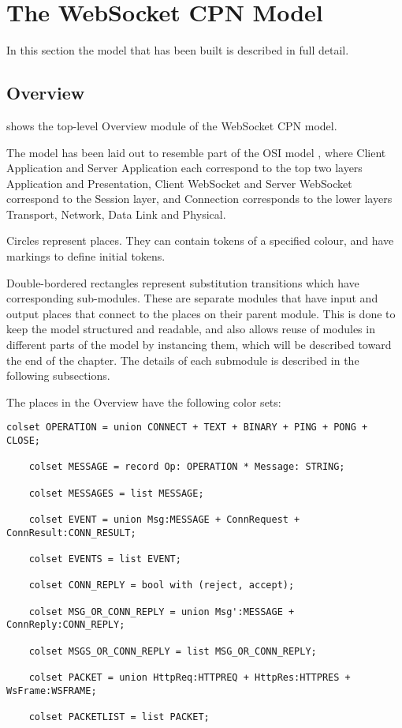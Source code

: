 \section{The WebSocket CPN Model}

In this section the model that has been built is described in full detail.

\subsection{Overview}

	
	 shows the top-level Overview module of the WebSocket
	CPN model.
	
	The model has been laid out to resemble part of the OSI model \cite{osi7}, where
	Client Application and Server Application each correspond to the top two
	layers Application and Presentation, Client WebSocket and Server WebSocket
	correspond to the Session layer, and Connection corresponds to the lower layers
	Transport, Network, Data Link and Physical.
	
	Circles represent places. They can contain tokens of a specified colour, and
	have markings to define initial tokens.
	
	Double-bordered rectangles represent substitution transitions which have
	corresponding sub-modules. These are separate modules that have input and
	output places that connect to the places on their parent module. This is done to
	keep the model structured and readable, and also allows reuse of modules in
	different parts of the model by instancing them, which will be described
	toward the end of the chapter. The details of each submodule is described in
	the following subsections.
	
	The places in the Overview have the following color sets:
	
	\begin{lstlisting}[label=lst:overview_colset,caption=Overview color
	sets,gobble=1]
	colset OPERATION = union CONNECT + TEXT + BINARY + PING + PONG + CLOSE;
	
	colset MESSAGE = record Op: OPERATION *	Message: STRING;
	
	colset MESSAGES = list MESSAGE;
	
	colset EVENT = union Msg:MESSAGE + ConnRequest + ConnResult:CONN_RESULT;
	
	colset EVENTS = list EVENT;
	
	colset CONN_REPLY = bool with (reject, accept);
	
	colset MSG_OR_CONN_REPLY = union Msg':MESSAGE + ConnReply:CONN_REPLY;
	
	colset MSGS_OR_CONN_REPLY = list MSG_OR_CONN_REPLY;
	
	colset PACKET = union HttpReq:HTTPREQ + HttpRes:HTTPRES + WsFrame:WSFRAME;
	
	colset PACKETLIST = list PACKET;
	\end{lstlisting}
	
